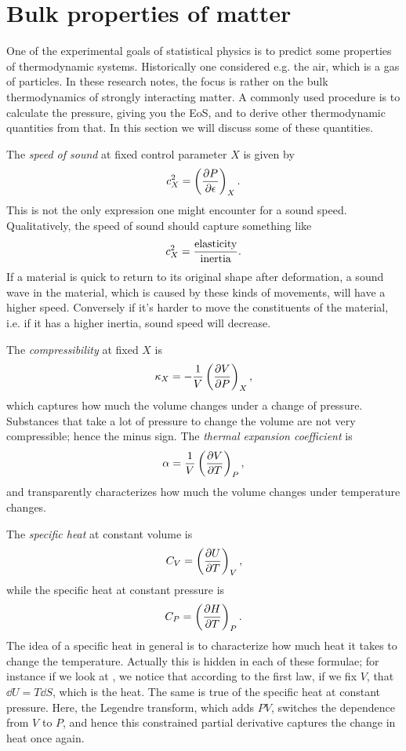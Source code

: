 \section{Bulk properties of matter}

One of the experimental goals of statistical physics is to predict some
properties of thermodynamic systems. Historically one considered e.g.
the air, which is a gas of particles. In these research notes, the focus
is rather on the bulk thermodynamics of strongly interacting matter.
A commonly used procedure is to calculate the pressure, giving
you the EoS, and to derive other thermodynamic quantities from that.
In this section we will discuss some of these quantities.

The {\it speed of sound} at fixed control parameter $X$
is given by
\begin{equation}
  c_X^2=\left(\pdv{P}{\epsilon}\right)_{X}.
\end{equation}
This is not the only expression one might encounter for a sound speed.
Qualitatively, the speed of sound should capture something like
\begin{equation}
  c_X^2=\frac{{\rm elasticity}}{{\rm inertia}}.
\end{equation}
If a material is quick to return to its original shape after deformation, a sound
wave in the material, which is caused by these kinds of movements, will have a
higher speed. Conversely if it's harder to move the constituents of the
material, i.e. if it has a higher inertia, sound speed will decrease.


The {\it compressibility} at fixed $X$ is
\begin{equation}
  \kappa_X=-\frac{1}{V}\left(\pdv{V}{P}\right)_{X},
\end{equation}
which captures how much the volume changes under a change of pressure.
Substances that take a lot of pressure to change the volume are not
very compressible; hence the minus sign.
The {\it thermal expansion coefficient}
is
\begin{equation}
  \alpha=\frac{1}{V}\left(\pdv{V}{T}\right)_{P},
\end{equation}
and transparently characterizes how much the volume changes under temperature
changes.

The {\it specific heat} at constant volume is
\begin{equation}\label{eq:CV}
  C_V=\left(\pdv{U}{T}\right)_{V},
\end{equation}
while the specific heat at constant pressure is
\begin{equation}
  C_P=\left(\pdv{H}{T}\right)_{P}.
\end{equation}
The idea of a specific heat in general is to characterize how much heat
it takes to change the temperature. Actually this is hidden in each of
these formulae; for instance if we look at , we notice
that according to the first law, if we fix $V$, that
$\dd U=T\dd S$, which is the heat. The same is true of the specific heat
at constant pressure. Here, the Legendre transform, which adds $PV$,
switches the dependence from $V$ to $P$, and hence this constrained
partial derivative captures the change in heat once again.

